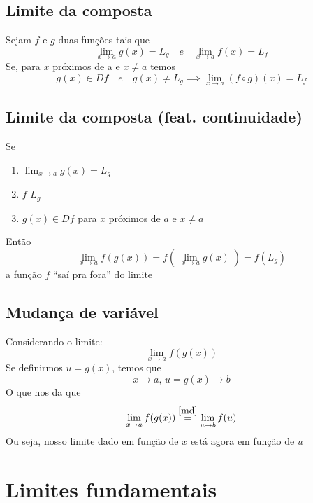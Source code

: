 \subsection{Limite da composta}

Sejam \(f\) e \(g\) duas funções tais que
\begin{equation*}
    \lim_{x \to a} g(x) = L_g 
    \quad e \quad
    \lim_{x \to a} f(x) = L_f
\end{equation*}
Se, para \(x\) próximos de a e \(x \neq a\) temos
\begin{equation}
    g(x) \in Df \quad e \quad g(x) \neq L_g
    \implies \lim_{x \to a} (f \circ g)(x) = L_f 
\end{equation}

\subsection{Limite da composta (feat. continuidade)}
Se
\begin{enumerate}
    \item \(\lim_{x \to a} g(x) = L_g\)
    \item \(f\)  \(L_g\)
    \item \(g(x) \in Df\) para \(x\) próximos de \(a\) e \(x \neq a\)
\end{enumerate}
Então
\begin{equation}
    \lim_{x \to a} f(g(x)) 
    = 
    f \left(
        \;
        \lim_{x \to a} g(x)  
        \;
      \right)
    = f (L_g)  
\end{equation}
a função \(f\) ``saí pra fora'' do limite
\subsection{Mudança de variável}
Considerando o limite:
\begin{equation*}
    \lim_{x \to a} f(g(x))
\end{equation*}
Se definirmos \(u = g(x)\),
temos que
\begin{equation}\label{md}
    x \to a,\, u = g(x) \to b
\end{equation}
O que nos da que
\begin{equation*}
    \lim_{x \to a} f(g(x)) 
    \stackrel{\ref{md}}{=}
    \lim_{u \to b} f(u) 
\end{equation*}
Ou seja, nosso limite dado em função de \(x\) está agora em função de \(u\)
\section{Limites fundamentais}

